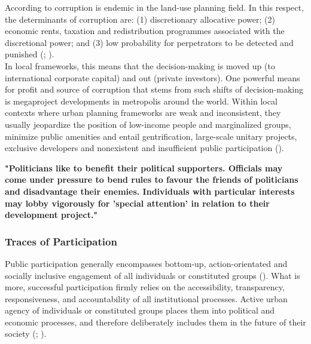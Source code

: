\documentclass[11pt]{report}
\begin{document}
According to
\href{Chiodelli}{\cite{chiodelli_corruption_2015}} corruption is endemic in the land-use planning field.
In this respect, the determinants of corruption are:
(1) discretionary allocative power; (2) economic rents, taxation and redistribution programmes associated with the discretional power; and (3) low probability for perpetrators to be detected and punished
(\href{Healey}{\citealt{healey_collaborative_1997}}; 
\href{Chiodelli}{\citealt{chiodelli_corruption_2015}}).
\\

In local frameworks, this means that the decision-making is moved up (to international corporate capital) and out (private investors).
One powerful means for profit and source of corruption that stems from such shifts of decision-making is megaproject developments in metropolis around the world.
Within local contexts where urban planning frameworks are weak and inconsistent, they usually jeopardize the position of low-income people and marginalized groups, minimize public amenities and entail gentrification, large-scale unitary projects, exclusive developers and nonexistent and insufficient public participation (\href{Farnstein}{\citealt{Farnstein_Just_2010}}).

\textbf{"Politicians like to benefit their political supporters. Officials may come under pressure to bend rules to favour the friends of politicians and disadvantage their enemies. Individuals with particular interests may lobby vigorously for 'special attention' in relation to their development project." \href{Healey}{\citealt{healey_collaborative_1997}}}

\subsubsection{Traces of Participation}

Public participation generally encompasses bottom-up, action-orientated and socially inclusive engagement of all individuals or constituted groups
(\href{UN}{\citealt{UN_building_2009}}).
What is more, successful participation firmly relies on the accessibility, transparency, responsiveness, and accountability of all institutional processes. Active urban agency of individuals or constituted groups places them into political and economic processes, and therefore deliberately includes them in the future of their society
(\href{Arnstein}{\citealt{arnstein_ladder_1969}};
\href{Fisher}{\citealt{fisher_building_2001}}).
\\
\end{document}
